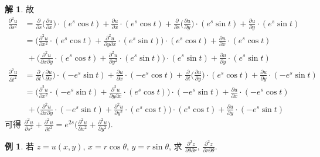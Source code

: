 \documentclass[12pt]{extarticle}
\newcommand{\ds}{\displaystyle}
\theoremstyle{definition}
\newtheorem*{ex}{例}
\newtheorem*{sol}{解}
\newcommand{\pdiff}[2]{\frac{\partial #1}{\partial #2}}
\newcommand{\pdifft}[2]{\frac{\partial^2 #1}{\partial #2^2}}
\begin{document}
\begin{sol}
  故
  \begin{align*}
    \pdifft{u}{s} &= \pdiff{}{s}\bigg(\pdiff{u}{x}\bigg)\cdot(e^s\cos t) + \pdiff{u}{x}\cdot(e^s\cos t) + \pdiff{}{s}\bigg(\pdiff{u}{y}\bigg)\cdot(e^s\sin t) + \pdiff{u}{y}\cdot(e^s\sin t) \\
    &= \bigg(\pdifft{u}{x}\cdot(e^s\cos t) + \frac{\partial^2 u}{\partial y\partial x}\cdot(e^s\sin t)\bigg)\cdot(e^s\cos t) + \pdiff{u}{x}\cdot(e^s\cos t)\\
    &\;+ \bigg(\frac{\partial^2 u}{\partial x\partial y}\cdot(e^s\cos t) + \pdifft{u}{y}\cdot(e^s\sin t)\bigg)\cdot(e^s\sin t) + \pdiff{u}{y}\cdot(e^s\sin t)\\
    \pdifft{u}{t} &= \pdiff{}{t}\bigg(\pdiff{u}{x}\bigg)\cdot(-e^s\sin t) + \pdiff{u}{x}\cdot(-e^s\cos t) + \pdiff{}{t}\bigg(\pdiff{u}{y}\bigg)\cdot(e^s\cos t) + \pdiff{u}{y}\cdot(-e^s\sin t) \\ &= \bigg(\pdifft{u}{x}\cdot(-e^s\sin t) + \frac{\partial^2 u}{\partial y\partial x}\cdot(e^s\cos t)\bigg)\cdot(-e^s\sin t) + \pdiff{u}{x}\cdot(-e^s\cos t) \\ &\;+ \bigg(\frac{\partial^2 u}{\partial x\partial y}\cdot(-e^s\sin t) + \pdifft{u}{y}\cdot(e^s\cos t)\bigg)\cdot(e^s\cos t) + \pdiff{u}{y}\cdot(-e^s\sin t) 
  \end{align*}
  可得 $\ds\pdifft{u}{s} + \pdifft{u}{t} = e^{2s}\bigg(\pdifft{u}{x} + \pdifft{u}{y}\bigg)$. 
\end{sol}

\begin{ex}
  若 $\ds z = u(x, y)$, $\ds x = r\cos\theta$, $\ds y = r\sin\theta$, 求 $\ds\frac{\partial^2 z}{\partial\theta\partial r}$, $\ds\frac{\partial^2 z}{\partial r\partial\theta}$. 
\end{ex}
\end{document}
